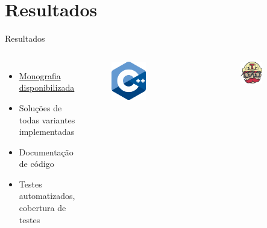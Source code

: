 \documentclass{beamer}
\begin{document}
\section{Resultados}

\begin{frame}{Resultados}
    \begin{columns}
        \begin{itemize}
            \item \href{https://www.linux.ime.usp.br/~gafeol/mac0499/chinese-postman/tex/main.pdf}{Monografia disponibilizada}
            \item Soluções de todas variantes implementadas
            \item Documentação de código
            \item Testes automatizados, cobertura de testes
        \end{itemize} 


        \center
        \begin{figure}
            \includegraphics[width=0.5\textwidth]{cpp.png}
        \end{figure}
        \begin{figure}
            \includegraphics[width=0.5\textwidth]{travis.png}
        \end{figure}
        
    \end{columns}

\end{frame}
\end{document}
